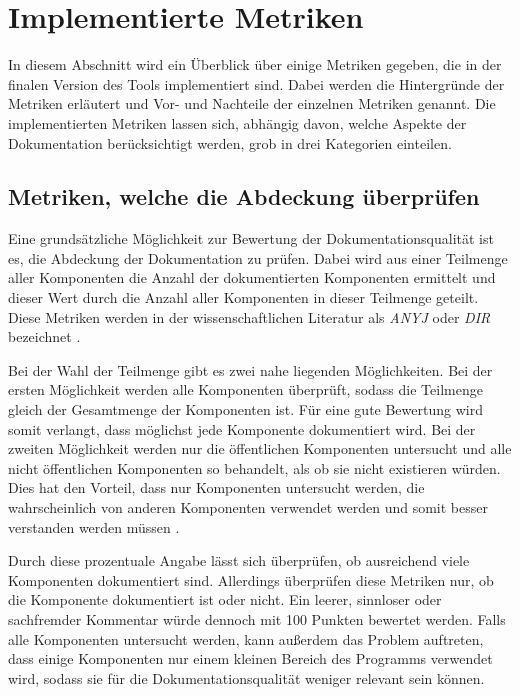 \section{Implementierte Metriken}\label{chapter:metrics}
In diesem Abschnitt wird ein Überblick über einige Metriken gegeben, die in der finalen Version des Tools implementiert sind. Dabei werden die Hintergründe der Metriken erläutert und Vor- und Nachteile der einzelnen Metriken genannt. Die implementierten Metriken lassen sich, abhängig davon, welche Aspekte der Dokumentation berücksichtigt werden,  grob in drei Kategorien einteilen.

\subsection{Metriken, welche die Abdeckung überprüfen}\label{chapter:metrics_coverage}
Eine grundsätzliche Möglichkeit zur Bewertung der Dokumentationsqualität ist es, die Abdeckung der Dokumentation zu prüfen. Dabei wird aus einer  Teilmenge aller Komponenten die Anzahl der dokumentierten Komponenten ermittelt und dieser Wert  durch die Anzahl aller Komponenten in dieser Teilmenge geteilt. Diese Metriken werden in der wissenschaftlichen Literatur als \textit{ANYJ} oder \textit{DIR} bezeichnet \cite[S. 5]{HowDocumentationEvolvesoverTime}.

Bei der Wahl der Teilmenge gibt es zwei nahe liegenden Möglichkeiten. Bei der ersten Möglichkeit werden alle Komponenten überprüft, sodass die Teilmenge gleich der Gesamtmenge der Komponenten ist. Für eine gute Bewertung wird somit verlangt, dass möglichst jede Komponente dokumentiert wird. Bei der zweiten Möglichkeit werden nur die öffentlichen Komponenten untersucht und alle nicht öffentlichen Komponenten so behandelt, als ob sie nicht existieren würden. Dies hat den Vorteil, dass nur Komponenten untersucht werden, die wahrscheinlich von anderen Komponenten verwendet werden und somit besser verstanden werden müssen \cite[S. 253]{JavadocViolationsandTheirEvolutioninOpen-SourceSoftware}. 


Durch diese prozentuale Angabe lässt sich überprüfen, ob ausreichend viele Komponenten dokumentiert sind. Allerdings überprüfen diese Metriken nur, ob die Komponente dokumentiert ist oder nicht. Ein leerer, sinnloser oder sachfremder Kommentar würde dennoch mit 100 Punkten bewertet werden. Falls alle Komponenten untersucht werden, kann außerdem das Problem auftreten, dass einige Komponenten nur einem kleinen Bereich des Programms verwendet wird, sodass sie für die Dokumentationsqualität weniger relevant sein können. 

